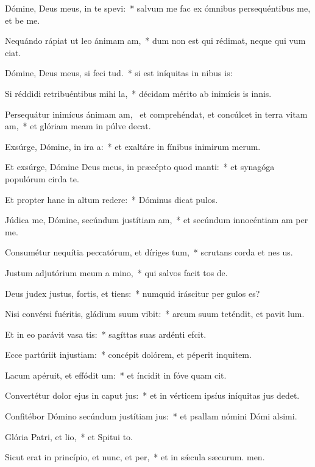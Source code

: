 \item Dómine, Deus meus, in te spevi:~* salvum me fac ex ómnibus persequéntibus me, et be me.
\item Nequándo rápiat ut leo ánimam am,~* dum non est qui rédimat, neque qui vum ciat.
\item Dómine, Deus meus, si feci tud.~* si est iníquitas in nibus is:
\item Si réddidi retribuéntibus mihi la,~* décidam mérito ab inimícis is innis.
\item Persequátur inimícus ánimam am,~\pscross{} et comprehéndat, et concúlcet in terra vitam am,~* et glóriam meam in púlve decat.
\item Exsúrge, Dómine, in ira a:~* et exaltáre in fínibus inimirum merum.
\item Et exsúrge, Dómine Deus meus, in præcépto quod manti:~* et synagóga populórum cirda te.
\item Et propter hanc in altum redere:~* Dóminus dicat pulos.
\item Júdica me, Dómine, secúndum justítiam am,~* et secúndum innocéntiam am per me.
\item Consumétur nequítia peccatórum, et díriges tum,~* scrutans corda et nes us.
\item Justum adjutórium meum a mino,~* qui salvos facit tos de.
\item Deus judex justus, fortis, et tiens:~* numquid iráscitur per gulos es?
\item Nisi convérsi fuéritis, gládium suum vibit:~* arcum suum teténdit, et pavit lum.
\item Et in eo parávit vasa tis:~* sagíttas suas ardénti efcit.
\item Ecce partúriit injustiam:~* concépit dolórem, et péperit inquitem.
\item Lacum apéruit, et effódit um:~* et íncidit in fóve quam cit.
\item Convertétur dolor ejus in caput jus:~* et in vérticem ipsíus iníquitas jus dedet.
\item Confitébor Dómino secúndum justítiam jus:~* et psallam nómini Dómi alsimi.
\item Glória Patri, et lio,~* et Spitui to.
\item Sicut erat in princípio, et nunc, et per,~* et in sǽcula sæcurum. men.
